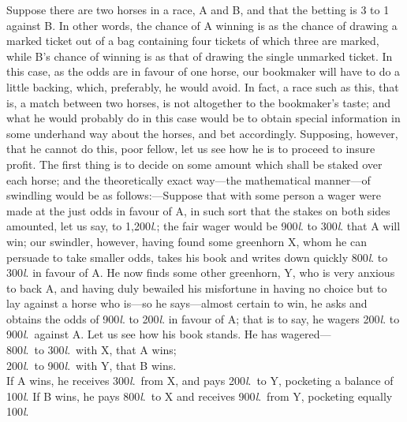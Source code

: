 \documentclass[letterpaper,12pt,oneside,openany]{memoir}
\begin{document}
Suppose there are two horses in a race, A and B,
and that the betting is 3 to 1 against B. In other words,
the chance of A winning is as the chance of drawing a
marked ticket out of a bag containing four tickets of
which three are marked, while B's chance of winning is
as that of drawing the single unmarked ticket. In this
case, as the odds are in favour of one horse, our bookmaker
will have to do a little backing, which, preferably,
he would avoid. In fact, a race such as this, that is, a
match between two horses, is not altogether to the
bookmaker's taste; and what he would probably do in
this case would be to obtain special information in some
underhand way about the horses, and bet accordingly.
Supposing, however, that he cannot do this, poor
fellow, let us see how he is to proceed to insure profit.
The first thing is to decide on some amount which shall
be staked over each horse; and the theoretically exact
way---the mathematical manner---of swindling would
be as follows:---Suppose that with some person a wager
were made at the just odds in favour of A, in such sort
that the stakes on both sides amounted, let us say, to
1,200\textit{l}.; the fair wager would be 900\textit{l}. to 300\textit{l}. that A
will win; our swindler, however, having found some
greenhorn X, whom he can persuade to take smaller
odds, takes his book and writes down quickly 800\textit{l}. to
300\textit{l}. in favour of A. He now finds some other greenhorn,
Y, who is very anxious to back A, and having
duly bewailed his misfortune in having no choice but
to lay against a horse who is---so he says---almost
certain to win, he asks and obtains the odds of 900\textit{l}.
to 200\textit{l}. in favour of A; that is to say, he wagers 200\textit{l}.
to 900\textit{l}.\ against A. Let us see how his book stands.
He has wagered---\\[2mm]
\hspace*{1cm}800\textit{l}.\ to 300\textit{l}.\ with X, that A wins;\\
\hspace*{1cm}200\textit{l}.\ to 900\textit{l}.\ with Y, that B wins.\\[2mm]
If A wins, he receives 300\textit{l}.\ from X, and pays 200\textit{l}.\ to
Y, pocketing a balance of 100\textit{l}. If B wins, he pays
800\textit{l}.\ to X and receives 900\textit{l}.\ from Y, pocketing equally
100\textit{l}.
\end{document}
